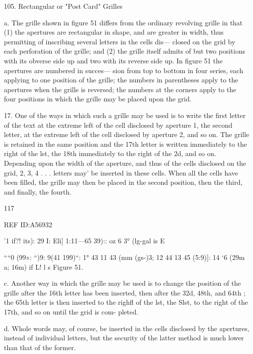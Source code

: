 105. Rectangular or "Post Card" Grilles

a. The grille shown in ﬁgure 51 differs from the ordinary revolving
grille in that (1) the apertures are rectangular in shape, and are greater
in width, thus permitting of inscribing several letters in the cells dis—
closed on the grid by each perforation of the grille; and (2) the grille
itself admits of but two positions with its obverse side up and two with
its reverse side up. In ﬁgure 51 the apertures are numbered in succes—
sion from top to bottom in four series, each applying to one position of
the grille; the numbers in parentheses apply to the apertures when the
grille is reversed; the numbers at the corners apply to the four positions
in which the grille may be placed upon the grid.

17. One of the ways in which such a grille may be used is to write the
ﬁrst letter of the text at the extreme left of the cell disclosed by aperture
1, the second letter, at the extreme left of the cell disclosed by aperture 2,
and so on. The grille is retained in the same position and the 17th letter
is written immediately to the right of the lst, the 18th immediately to the
right of the 2d, and so on. Depending upon the width of the aperture,
and thus of the cells disclosed on the grid, 2, 3, 4 . . . letters may' be
inserted in these cells. When all the cells have been ﬁlled, the grille may
then be placed in the second position, then the third, and ﬁnally, the
fourth.

117

 

 

 

 

REF ID:A56932

'1 if?! its):
29 I: Eli]
1:11—65 39)::
oz 6 3° (lg-gal
is E

 

 

 

 

““0 (99»:
“)9: 9(41
199)“: 1° 43
11 43 (mm
(gs-)3; 12 44
13 45 (5:9)]:
14 ‘6 (29m
{a}; 16m)
if L!
l s
Figure 51.

c. Another way in which the grille may be used is to change the
position of the grille after the 16th letter has been inserted, then after
the 32d, 48th, and 64th ; the 65th letter is then inserted to the righﬂ of
the lst, the Slst, to the right of the 17th, and so on until the grid is com-
pleted.

d. Whole words may, of course, be inserted in the cells disclosed by
the apertures, instead of individual letters, but the security of the latter
method is much lower than that of the former.

